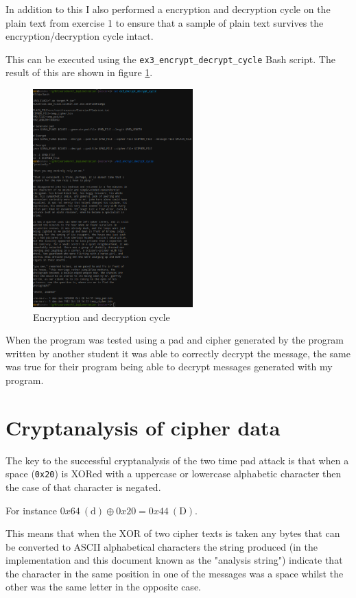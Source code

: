 \documentclass[a4paper]{article}
\begin{document}
In addition to this I also performed a encryption and decryption cycle on the
plain text from exercise 1 to ensure that a sample of plain text survives the
encryption/decryption cycle intact.

This can be executed using the \texttt{ex3\_encrypt\_decrypt\_cycle} Bash
script. The result of this are shown in figure \ref{fig:enc_dec_cycle}.

\begin{figure}[h!]
  \centering
  \includegraphics[width=0.55\textwidth]{graphics/ex3_enc_dec_cycle.eps}
  \caption{Encryption and decryption cycle}
  \label{fig:enc_dec_cycle}
\end{figure}

When the program was tested using a pad and cipher generated by the program
written by another student it was able to correctly decrypt the message, the
same was true for their program being able to decrypt messages generated with my
program.

\section{Cryptanalysis of cipher data}

The key to the successful cryptanalysis of the two time pad attack is that when
a space (\texttt{0x20}) is XORed with a uppercase or lowercase alphabetic
character then the case of that character is negated.

For instance $0x64 \  \mathrm{(d)} \oplus 0x20 = 0x44 \  \mathrm{(D)}$.

This means that when the XOR of two cipher texts is taken any bytes that can be
converted to ASCII alphabetical characters the string produced (in the
implementation and this document known as the "analysis string") indicate that
the character in the same position in one of the messages was a space whilst the
other was the same letter in the opposite case.
\end{document}
